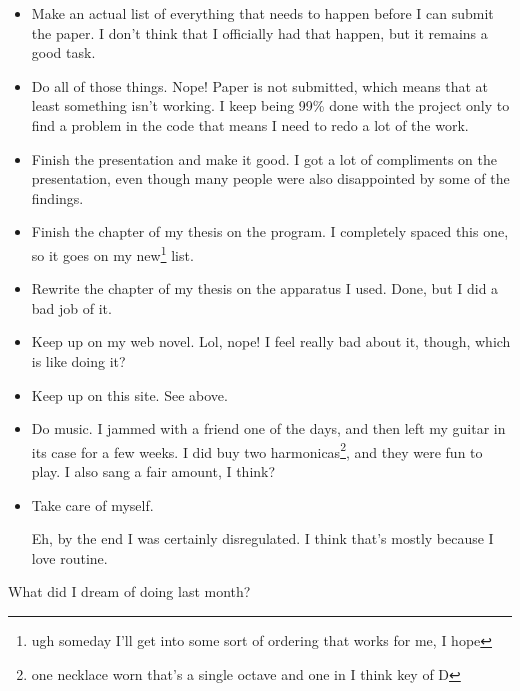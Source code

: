 \documentclass[12pt]{article}
\renewcommand{\,}{\textsuperscript{,}}
\begin{document}
\begin{itemize}

\item Make an actual list of everything that needs to happen before I can submit the paper. I don't think that I officially had that happen, but it remains a good task.

\item Do all of those things. Nope! Paper is not submitted, which means that at least something isn't working. I keep being 99\% done with the project only to find a problem in the code that means I need to redo a lot of the work.

\item Finish the presentation and make it good. I got a lot of compliments on the presentation, even though many people were also disappointed by some of the findings.

\item Finish the chapter of my thesis on the program.  
I completely spaced this one, so it goes on my new\footnote{ugh someday I'll get into some sort of ordering that works for me, I hope} list.

\item Rewrite the chapter of my thesis on the apparatus I used. Done, but I did a bad job of it.

\item Keep up on my web novel. Lol, nope! I feel really bad about it, though, which is like doing it?

\item Keep up on this site. See above.

\item Do music. I jammed with a friend one of the days, and then left my guitar in its case for a few weeks. I did buy two harmonicas\footnote{one necklace worn that's a single octave and one in I think key of D}, and they were fun to play.  
I also sang a fair amount, I think?

\item Take care of myself.

Eh, by the end I was certainly disregulated.  
I think that's mostly because I love routine.

\end{itemize}

What did I dream of doing last month?
\end{document}
